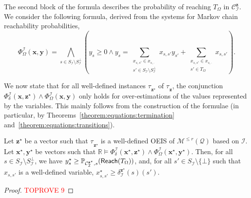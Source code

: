 \documentclass[a4paper,UKenglish,cleveref,autoref,thm-restate,colorlinks]{lipics-v2021}
\newcommand{\IR}{\mathbb{R}}
\newcommand{\mdp}{\mathcal{M}}
\newcommand{\mdpStateSpace}{S}
\newcommand{\mdpTrans}{\delta}
\newcommand{\ocmdp}{\mathcal{Q}}
\newcommand{\ocmdpFin}[2]{\mdp^{\leq #2}(#1)}
\newcommand{\ocConfig}{s}
\newcommand{\ocTrans}{\delta}
\newcommand{\counterUB}{r}
\newcommand{\mchain}{\mathcal{C}}
\newcommand{\intPart}{\mathcal{I}}
\newcommand{\compressChainStrat}[1]{\mchain^{#1}_{\intPart}}
\newcommand{\compressChainStateSpace}{\mdpStateSpace_{\intPart}}
\newcommand{\compressChainStateSpaceStar}{\mdpStateSpace_{\intPart}^{\bot}}
\newcommand{\compressChainTransTemplate}[2]{\mdpTrans^{#1}_{#2}}
\newcommand{\varTrans}{x}
\newcommand{\varTransTuple}{\mathbf{\varTrans}}
\newcommand{\solTrans}{\varTrans^\star}
\newcommand{\solTransTuple}{\mathbf{\varTrans}^{\star}}
\newcommand{\varObj}{y}
\newcommand{\varObjTuple}{\mathbf{\varObj}}
\newcommand{\solObj}{\varObj^{\star}}
\newcommand{\solObjTuple}{\mathbf{\varObj}^{\star}}
\newcommand{\varStrat}{z}
\newcommand{\varStratTuple}{\mathbf{\varStrat}}
\newcommand{\solStratTuple}{\mathbf{\varStrat}^{\star}}
\newcommand{\compressChainSymbolic}{\compressChainStrat{\varStratTuple}}
\newcommand{\compressChainSymSol}{\compressChainStrat{\solStratTuple}}
\newcommand{\compressChainTransSymSol}{\compressChainTransTemplate{\solStratTuple}{\intPart}}
\newcommand{\formulaTransBase}{\Phi_{\ocTrans}}
\newcommand{\formulaObjBase}{\Phi_{\objective}}
\newcommand{\formulaTrans}{\formulaTransBase^\intPart}
\newcommand{\formulaObj}{\formulaObjBase^\intPart}
\newcommand{\objective}{\Omega}
\newcommand{\reach}[1]{\mathsf{Reach}(#1)}
\newcommand{\target}{T}
\newcommand{\stratBGeneric}[1]{{\tau_{#1}}}
\newcommand{\stratB}{\stratBGeneric{}}
\begin{document}
The second block of the formula describes the probability of reaching $\target_\objective$ in $\compressChainSymbolic$.
We consider the following formula, derived from the systems for Markov chain reachability probabilities,
\begin{equation}\label{equation:verification:formula:objective}
  \formulaObj(\varTransTuple, \varObjTuple) =
  \bigwedge_{\ocConfig\in\compressChainStateSpace\setminus\compressChainStateSpaceStar}
  \left(
    \varObj_{\ocConfig}\geq 0\land
    \varObj_{\ocConfig} =
    \sum_{\substack{
        \varTrans_{\ocConfig, \ocConfig'}\in\varTrans_{\ocConfig, \cdot}\\
        \ocConfig'\in\compressChainStateSpace\setminus\compressChainStateSpaceStar}
    }
    \varTrans_{\ocConfig, \ocConfig'}\varObj_{\ocConfig'} +
    \sum_{\substack{
        \varTrans_{\ocConfig, \ocConfig'}\in\varTrans_{\ocConfig, \cdot}\\
        \ocConfig'\in\target_\objective}}
    \varTrans_{\ocConfig, \ocConfig'}
  \right).
\end{equation}

We now state that for all well-defined instances $\stratB_{\solStratTuple}$ of $\stratB_{\varStratTuple}$, the conjunction $\formulaTrans(\varTransTuple,\solStratTuple)\land\formulaObj(\varTransTuple, \varObjTuple)$ only holds for over-estimations of the values represented by the variables.
This mainly follows from the construction of the formulae (in particular, by Theorems~\ref{theorem:equations:termination} and~\ref{theorem:equations:transitions}).
\begin{lemma}\label{lemma:verification:oeis:least assignment}
  Let $\solStratTuple$ be a vector such that $\stratB_{\solStratTuple}$ is a well-defined OEIS of $\ocmdpFin{\ocmdp}{\counterUB}$ based on $\intPart$.
  Let $\solTransTuple, \solObjTuple$ be vectors such that $\IR\models\formulaTrans(\solTransTuple,\solStratTuple)\land\formulaObj(\solTransTuple, \solObjTuple)$.
  Then, for all $\ocConfig\in\compressChainStateSpace\setminus\compressChainStateSpaceStar$, we have $\solObj_{\ocConfig}\geq\probaMCverb{\compressChainSymSol}{\ocConfig}(\reach{\target_\objective})$, and, for all $\ocConfig'\in\compressChainStateSpace\setminus\{\bot\}$ such that $\varTrans_{\ocConfig,\ocConfig'}$ is a well-defined variable, $\solTrans_{\ocConfig, \ocConfig'}\geq\compressChainTransSymSol(\ocConfig)(\ocConfig')$.
\end{lemma}
\begin{proof}\textcolor{red}{TOPROVE 9}\end{proof}
\end{document}
